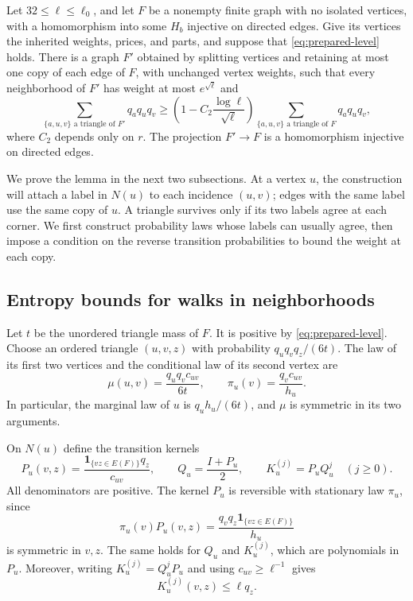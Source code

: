 \begin{lemma}
\label{lem:triangle-splitting}
Let $32\le\ell\le\ell_0$, and let $F$ be a nonempty finite graph with no isolated
vertices, with a homomorphism into some $H_b$ injective on directed edges.
Give its vertices the inherited weights, prices, and parts, and suppose
that \eqref{eq:prepared-level} holds.  There is a graph $F'$ obtained by
splitting vertices and retaining at most one copy of each edge of $F$,
with unchanged vertex weights, such that every neighborhood of $F'$ has
weight at most $e^{\sqrt\ell}$ and
\begin{equation}
 \sum_{\{a,u,v\}\text{ a triangle of }F'}q_aq_uq_v
 \ge \left(1-C_2\frac{\log\ell}{\sqrt\ell}\right)
       \sum_{\{a,u,v\}\text{ a triangle of }F}q_aq_uq_v,
 \label{eq:split-retention}
\end{equation}
where $C_2$ depends only on $r$.  The projection $F'\to F$ is a
homomorphism injective on directed edges.
\end{lemma}

We prove the lemma in the next two subsections.  At a vertex $u$, the
construction will attach a label in $N(u)$ to each incidence $(u,v)$;
edges with the same label use the same copy of $u$.  A triangle survives
only if its two labels agree at each corner.  We first construct
probability laws whose labels can usually agree, then impose a condition
on the reverse transition probabilities to bound the weight at each
copy.

\subsection{Entropy bounds for walks in neighborhoods}
\label{subsec:neighborhood-entropy}

Let $t$ be the unordered triangle mass of $F$.  It is positive by
\eqref{eq:prepared-level}.  Choose an ordered triangle $(u,v,z)$ with
probability $q_uq_vq_z/(6t)$.  The law of its first two vertices and the
conditional law of its second vertex are
\begin{equation}
 \mu(u,v)=\frac{q_uq_vc_{uv}}{6t},\qquad
 \pi_u(v)=\frac{q_vc_{uv}}{h_u}.
 \label{eq:triangle-laws}
\end{equation}
In particular, the marginal law of $u$ is $q_uh_u/(6t)$, and $\mu$ is
symmetric in its two arguments.

On $N(u)$ define the transition kernels
\begin{equation}
 P_u(v,z)=\frac{\mathbf 1_{\{vz\in E(F)\}}q_z}{c_{uv}},\qquad
 Q_u=\frac{I+P_u}{2},\qquad
 K_u^{(j)}=P_uQ_u^j\quad(j\ge0).
 \label{eq:neighborhood-kernels}
\end{equation}
All denominators are positive.  The kernel $P_u$ is reversible with
stationary law $\pi_u$, since
\[
 \pi_u(v)P_u(v,z)=\frac{q_vq_z\mathbf 1_{\{vz\in E(F)\}}}{h_u}
\]
is symmetric in $v,z$.  The same holds for $Q_u$ and $K_u^{(j)}$, which
are polynomials in $P_u$.  Moreover, writing
$K_u^{(j)}=Q_u^jP_u$ and using $c_{uv}\ge\ell^{-1}$ gives
\begin{equation}
 K_u^{(j)}(v,z)\le\ell q_z.
 \label{eq:kernel-density-bound}
\end{equation}

